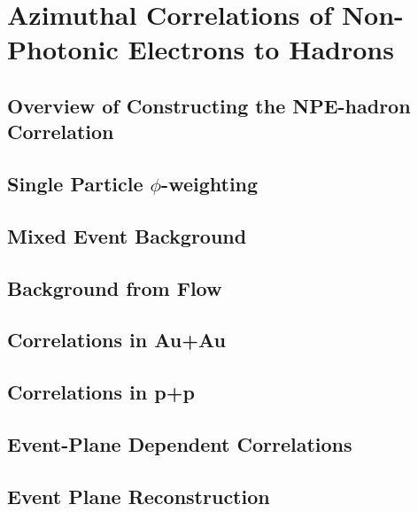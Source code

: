 \chapter{Azimuthal Correlations of Non-Photonic Electrons to Hadrons}

\section{Overview of Constructing the NPE-hadron Correlation}

\section{Single Particle $\phi$-weighting}

\section{Mixed Event Background}

\section{Background from Flow}

\section{Correlations in Au+Au}

\section{Correlations in p+p}

\section{Event-Plane Dependent Correlations}

\section{Event Plane Reconstruction}

